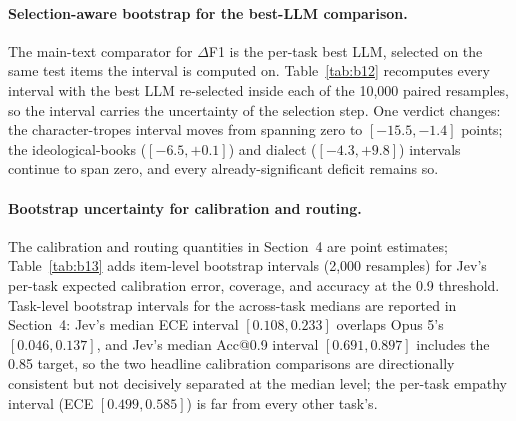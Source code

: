 \documentclass[11pt]{article}
\begin{document}
\paragraph{Selection-aware bootstrap for the best-LLM comparison.}
The main-text comparator for $\Delta$F1 is the per-task best LLM, selected on the same test items the interval is computed on. Table~\ref{tab:b12} recomputes every interval with the best LLM re-selected inside each of the 10{,}000 paired resamples, so the interval carries the uncertainty of the selection step. One verdict changes: the character-tropes interval moves from spanning zero to $[-15.5, -1.4]$ points; the ideological-books ($[-6.5, +0.1]$) and dialect ($[-4.3, +9.8]$) intervals continue to span zero, and every already-significant deficit remains so.

\begin{table}[!htbp]
\centering
\caption{Per-task $\Delta$F1 (Jev minus best LLM, points) with the fixed-best interval and the selection-aware interval that re-selects the best LLM inside each resample.}
\label{tab:b12}
\small

\end{table}

\paragraph{Bootstrap uncertainty for calibration and routing.}
The calibration and routing quantities in Section~4 are point estimates; Table~\ref{tab:b13} adds item-level bootstrap intervals (2{,}000 resamples) for Jev's per-task expected calibration error, coverage, and accuracy at the 0.9 threshold. Task-level bootstrap intervals for the across-task medians are reported in Section~4: Jev's median ECE interval $[0.108, 0.233]$ overlaps Opus 5's $[0.046, 0.137]$, and Jev's median Acc@0.9 interval $[0.691, 0.897]$ includes the 0.85 target, so the two headline calibration comparisons are directionally consistent but not decisively separated at the median level; the per-task empathy interval (ECE $[0.499, 0.585]$) is far from every other task's.

\begin{table}[!htbp]
\centering
\caption{Item-level bootstrap intervals for Jev's per-task calibration and routing quantities (2{,}000 resamples; -- marks an empty 0.9-confidence subset).}
\label{tab:b13}
\small

\end{table}
\end{document}
